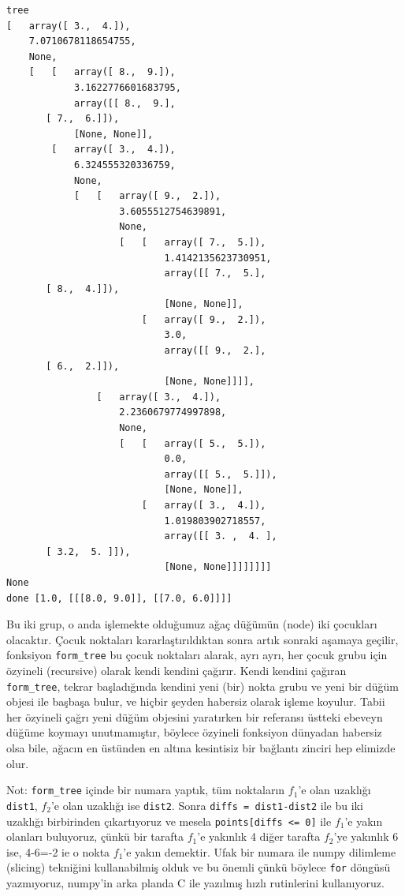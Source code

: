 \documentclass[12pt,fleqn]{article}\usepackage{../../common}
\begin{document}
\begin{verbatim}
tree
[   array([ 3.,  4.]),
    7.0710678118654755,
    None,
    [   [   array([ 8.,  9.]),
            3.1622776601683795,
            array([[ 8.,  9.],
       [ 7.,  6.]]),
            [None, None]],
        [   array([ 3.,  4.]),
            6.324555320336759,
            None,
            [   [   array([ 9.,  2.]),
                    3.6055512754639891,
                    None,
                    [   [   array([ 7.,  5.]),
                            1.4142135623730951,
                            array([[ 7.,  5.],
       [ 8.,  4.]]),
                            [None, None]],
                        [   array([ 9.,  2.]),
                            3.0,
                            array([[ 9.,  2.],
       [ 6.,  2.]]),
                            [None, None]]]],
                [   array([ 3.,  4.]),
                    2.2360679774997898,
                    None,
                    [   [   array([ 5.,  5.]),
                            0.0,
                            array([[ 5.,  5.]]),
                            [None, None]],
                        [   array([ 3.,  4.]),
                            1.019803902718557,
                            array([[ 3. ,  4. ],
       [ 3.2,  5. ]]),
                            [None, None]]]]]]]]
None
done [1.0, [[[8.0, 9.0]], [[7.0, 6.0]]]]
\end{verbatim}

Bu iki grup, o anda işlemekte olduğumuz ağaç düğümün (node) iki
çocukları olacaktır. Çocuk noktaları kararlaştırıldıktan sonra artık
sonraki aşamaya geçilir, fonksiyon \verb!form_tree! bu çocuk
noktaları alarak, ayrı ayrı, her çocuk grubu için özyineli (recursive)
olarak kendi kendini çağırır. Kendi kendini çağıran
\verb!form_tree!, tekrar başladığında kendini yeni (bir) nokta
grubu ve yeni bir düğüm objesi ile başbaşa bulur, ve hiçbir şeyden
habersiz olarak işleme koyulur. Tabii her özyineli çağrı yeni düğüm
objesini yaratırken bir referansı üstteki ebeveyn düğüme koymayı
unutmamıştır, böylece özyineli fonksiyon dünyadan habersiz olsa bile,
ağacın en üstünden en altına kesintisiz bir bağlantı zinciri hep
elimizde olur.

Not: \verb!form_tree! içinde bir numara yaptık, tüm noktaların $f_1$'e olan
uzaklığı \verb!dist1!, $f_2$'e olan uzaklığı ise \verb!dist2!. Sonra
\verb!diffs = dist1-dist2! ile bu iki uzaklığı birbirinden çıkartıyoruz ve
mesela \verb!points[diffs <= 0]!  ile $f_1$'e yakın olanları buluyoruz,
çünkü bir tarafta $f_1$'e yakınlık 4 diğer tarafta $f_2$'ye yakınlık 6 ise,
4-6=-2 ie o nokta $f_1$'e yakın demektir. Ufak bir numara ile numpy
dilimleme (slicing) tekniğini kullanabilmiş olduk ve bu önemli çünkü
böylece \verb!for! döngüsü yazmıyoruz, numpy'in arka planda C ile yazılmış
hızlı rutinlerini kullanıyoruz.
\end{document}
